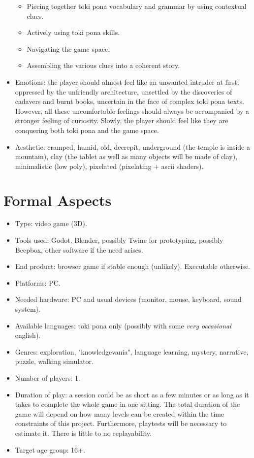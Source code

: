 \documentclass{scrartcl}
\begin{document}
\begin{itemize}
				\begin{itemize}
					\item Piecing together toki pona vocabulary and grammar by using contextual clues.
					\item Actively using toki pona skills.
					\item Navigating the game space.
					\item Assembling the various clues into a coherent story.
				\end{itemize}
			\item Emotions: the player should almost feel like an unwanted intruder at first; oppressed by the unfriendly architecture, unsettled by the discoveries of cadavers and burnt books, uncertain in the face of complex toki pona texts. However, all these uncomfortable feelings should always be accompanied by a stronger feeling of curiosity. Slowly, the player should feel like they are conquering both toki pona and the game space.
			\item Aesthetic: cramped, humid, old, decrepit, underground (the temple is inside a mountain), clay (the tablet as well as many objects will be made of clay), minimalistic (low poly), pixelated (pixelating + ascii shaders).
				
		\end{itemize}
	\section{Formal Aspects}
		\begin{itemize}
			\item Type: video game (3D).
			\item Tools used: Godot, Blender, possibly Twine for prototyping, possibly Beepbox, other software if the need arises.
			\item End product: browser game if stable enough (unlikely). Executable otherwise.
			\item Platforms: PC.
			\item Needed hardware: PC and usual devices (monitor, mouse, keyboard, sound system).
			\item Available languages: toki pona only (possibly with some \textit{very occasional} english).
			\item Genres: exploration, "knowledgevania", language learning, mystery, narrative, puzzle, walking simulator.
			\item Number of players: 1.
			\item Duration of play: a session could be as short as a few minutes or as long as it takes to complete the whole game in one sitting. The total duration of the game will depend on how many levels can be created within the time constraints of this project. Furthermore, playtests will be necessary to estimate it. There is little to no replayability.
			\item Target age group: 16+.
		\end{itemize}
\end{document}
